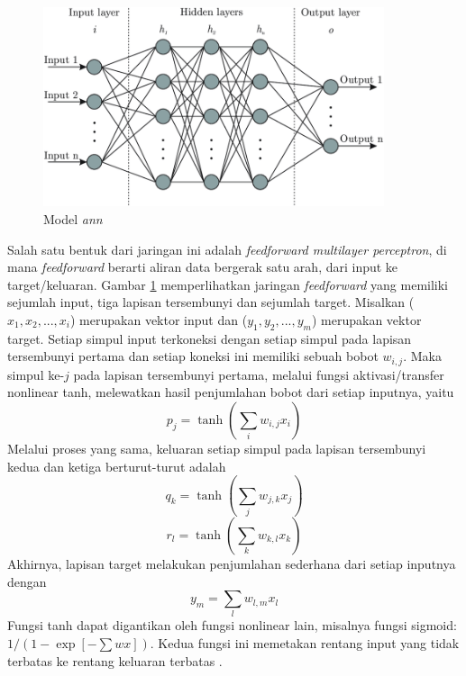 \begin{figure}
    \centering
    \includegraphics[width=10cm]{gambar/model_ann.png}
    \caption[Model \textit{\acrlong{ann}}]{Model \textit{\acrlong{ann}} \protect{}}
    \label{fig:modelann}
\end{figure}
Salah satu bentuk dari jaringan ini adalah \textit{feedforward multilayer perceptron}, di mana \textit{feedforward} berarti aliran data bergerak satu arah, dari input ke target/keluaran. Gambar \ref{fig:modelann} memperlihatkan jaringan \textit{feedforward} yang memiliki sejumlah input, tiga lapisan tersembunyi dan sejumlah target. Misalkan ($x_1, x_2, ..., x_i$) merupakan vektor input dan ($y_1, y_2, ..., y_m$) merupakan vektor target. Setiap simpul input terkoneksi dengan setiap simpul pada lapisan tersembunyi pertama dan setiap koneksi ini memiliki sebuah bobot $w_{i,j}$. Maka simpul ke-$j$ pada lapisan tersembunyi pertama, melalui fungsi aktivasi/transfer nonlinear tanh, melewatkan hasil penjumlahan bobot dari setiap inputnya, yaitu
\begin{equation}
    p_j = \tanh \left(\sum_i{w_{i,j}x_i}\right)
    \label{equ:hd1}
\end{equation}
Melalui proses yang sama, keluaran setiap simpul pada lapisan tersembunyi kedua dan ketiga berturut-turut adalah
\begin{equation}
    q_k = \tanh \left(\sum_j{w_{j,k}x_j}\right)
    \label{equ:hd2}
\end{equation}
\begin{equation}
    r_l = \tanh \left(\sum_k{w_{k,l}x_k}\right)
    \label{equ:hd3}
\end{equation}
Akhirnya, lapisan target melakukan penjumlahan sederhana dari setiap inputnya dengan
\begin{equation}
    y_m = \sum_l{w_{l,m}x_l}
    \label{equ:ol}
\end{equation}
Fungsi tanh dapat digantikan oleh fungsi nonlinear lain, misalnya fungsi sigmoid: $1/(1-\exp{\left[-\sum{wx}\right]})$. Kedua fungsi ini memetakan rentang input yang tidak terbatas ke rentang keluaran terbatas .

